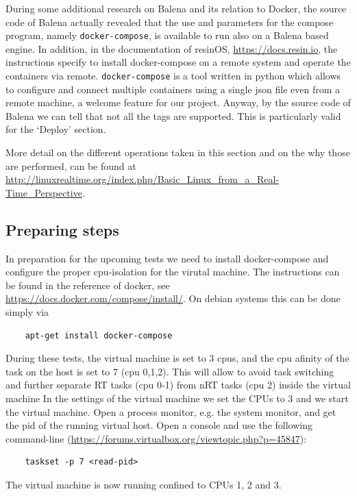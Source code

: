 \documentclass[]{scrartcl}
\begin{document}
During some additional research on Balena and its relation to Docker, the source code of Balena actually revealed that the use and parameters for the compose program, namely \texttt{docker-compose}, is available to run also on a Balena based engine. In addition, in the documentation of resinOS, \url{https://docs.resin.io}, the instructions specify to install docker-compose on a remote system and operate the containers via remote.
\texttt{docker-compose} is a tool written in python which allows to configure and connect multiple containers using a single json file even from a remote machine, a welcome feature for our project.
Anyway, by the source code of Balena we can tell that not all the tags are supported. This is particularly valid for the `Deploy' section.

More detail on the different operations taken in this section and on the why those are performed, can be found at \url{http://linuxrealtime.org/index.php/Basic_Linux_from_a_Real-Time_Perspective}.

\subsection{Preparing steps}

In preparation for the upcoming tests we need to install docker-compose and configure the proper cpu-isolation for the virutal machine.
The instructions can be found in the reference of docker, see  \url{https://docs.docker.com/compose/install/}. 
On debian systems this can be done simply via 

\begin{verbatim}
	apt-get install docker-compose
\end{verbatim}

During these tests, the virtual machine is set to 3 cpus, and the cpu afinity of the task on the host is set to 7 (cpu 0,1,2). This will allow to avoid task switching and further separate RT tasks (cpu 0-1) from nRT tasks (cpu 2) inside the virtual machine
In the settings of the virtual machine we set the CPUs to 3 and we start the virtual machine.  Open a process monitor, e.g. the system monitor, and get the pid of the running virtual host. Open a console and use the following command-line (\url{https://forums.virtualbox.org/viewtopic.php?p=45847}):

\begin{verbatim}
	taskset -p 7 <read-pid>
\end{verbatim} 

The virtual machine is now running confined to CPUs 1, 2 and 3.
\end{document}
